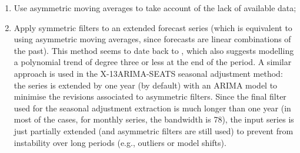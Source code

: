 \documentclass[
]{article}
\newcommand\1{\mathds{1}}
\begin{document}
\begin{enumerate}
\def\labelenumi{\arabic{enumi}.}
\item
  Use asymmetric moving averages to take account of the lack of
  available data;
\item
  Apply symmetric filters to an extended forecast series (which is
  equivalent to using asymmetric moving averages, since forecasts are
  linear combinations of the past). This method seems to date back to
  \textcite{deforest1877adjustment}, which also suggests modelling a
  polynomial trend of degree three or less at the end of the period. A
  similar approach is used in the X-13ARIMA-SEATS seasonal adjustment
  method: the series is extended by one year (by default) with an ARIMA
  model to minimise the revisions associated to asymmetric filters.
  Since the final filter used for the seasonal adjustment extraction is
  much longer than one year (in most of the cases, for monthly series,
  the bandwidth is 78), the input series is just partially extended (and
  asymmetric filters are still used) to prevent from instability over
  long periods (e.g., outliers or model shifts).
\end{enumerate}
\end{document}
